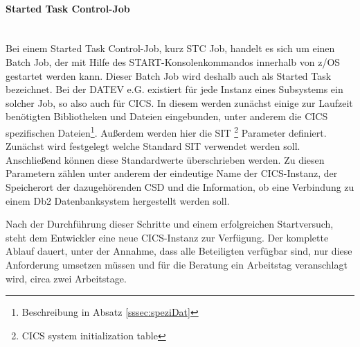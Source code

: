 \paragraph{Started Task Control-Job} ~\\
Bei einem Started Task Control-Job, kurz STC Job, handelt es sich um einen Batch Job, der mit Hilfe des \glqq START\grqq-Konsolenkommandos innerhalb von z/OS gestartet werden kann.
Dieser Batch Job wird deshalb auch als Started Task bezeichnet.\cite{Cassier.2007}
Bei der DATEV e.G. existiert für jede Instanz eines Subsystems ein solcher Job, so also auch für CICS.
In diesem werden zunächst einige zur Laufzeit benötigten Bibliotheken und Dateien eingebunden, unter anderem die CICS spezifischen Dateien\footnote{Beschreibung in Absatz \ref{sssec:speziDat}}.
Außerdem werden hier die SIT \footnote{CICS system initialization table} Parameter definiert.
Zunächst wird festgelegt welche Standard SIT verwendet werden soll.
Anschließend können diese Standardwerte überschrieben werden.
Zu diesen Parametern zählen unter anderem der eindeutige Name der CICS-Instanz, der Speicherort der dazugehörenden CSD und die Information, ob eine Verbindung zu einem Db2 Datenbanksystem hergestellt werden soll.

Nach der Durchführung dieser Schritte und einem erfolgreichen Startversuch, steht dem Entwickler eine neue CICS-Instanz zur Verfügung.
Der komplette Ablauf dauert, unter der Annahme, dass alle Beteiligten verfügbar sind, nur diese Anforderung umsetzen müssen und für die Beratung ein Arbeitstag veranschlagt wird, circa zwei Arbeitstage.

